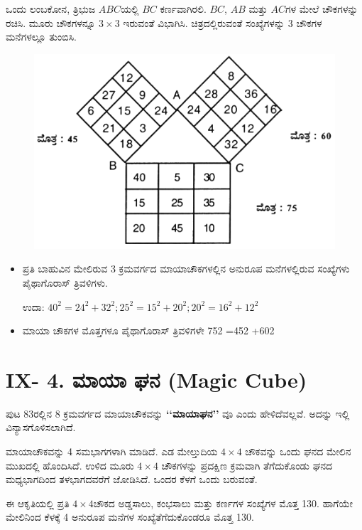 \medskip
ಒಂದು ಲಂಬಕೋನ, ತ್ರಿಭುಜ $ABC$ಯಲ್ಲಿ $BC$ ಕರ್ಣವಾಗಿರಲಿ. $BC$, $AB$ ಮತ್ತು $AC$ಗಳ ಮೇಲೆ ಚೌಕಗಳನ್ನು ರಚಿಸಿ. ಮೂರು ಚೌಕಗಳನ್ನೂ $3 \times 3$ ಇರುವಂತೆ \break ವಿಭಾಗಿಸಿ. ಚಿತ್ರದಲ್ಲಿರುವಂತೆ ಸಂಖ್ಯೆಗಳನ್ನು 3 ಚೌಕಗಳ ಮನೆಗಳಲ್ಲೂ ತುಂಬಿಸಿ.
\begin{figure}[H]
\includegraphics[scale=1.2]{src/figures/chap8/fig8-10.jpg}
\end{figure}
\begin{itemize}
	\item ಪ್ರತಿ ಬಾಹುವಿನ ಮೇಲಿರುವ 3 ಕ್ರಮವರ್ಗದ ಮಾಯಾಚೌಕಗಳಲ್ಲಿನ ಅನುರೂಪ ಮನೆಗಳಲ್ಲಿರುವ ಸಂಖ್ಯೆಗಳು ಪೈಥಾಗೊರಾಸ್ ತ್ರಿವಳಿಗಳು.

	ಉದಾ: $40^2 = 24^2 +32^2 ; 25^2 =15^2 +20^2 ; 20^2 =16^2+12^2$\smallskip
	\item ಮಾಯಾ ಚೌಕಗಳ ಮೊತ್ತಗಳೂ ಪೈಥಾಗೊರಾಸ್ ತ್ರಿವಳಿಗಳೇ 752 =452 +602
\end{itemize}
\eject

\section*{IX- 4. ಮಾಯಾ ಘನ (Magic Cube)}

ಪುಟ 83ರಲ್ಲಿನ 8 ಕ್ರಮವರ್ಗದ ಮಾಯಾಚೌಕವನ್ನು \textbf{‘‘ಮಾಯಾಘನ’’} ವೂ ಎಂದು ಹೇಳಿದೆವಲ್ಲವೆ. ಅದನ್ನು ಇಲ್ಲಿ ವಿನ್ಯಾಸಗೊಳಿಸಲಾಗಿದೆ.

ಮಾಯಾಚೌಕವನ್ನು 4 ಸಮಭಾಗಗಳಾಗಿ ಮಾಡಿದೆ. ಎಡ ಮೇಲ್ತುದಿಯ $4 \times 4$ ಚೌಕ\-ವನ್ನು ಒಂದು ಘನದ ಮೇಲಿನ ಮುಖದಲ್ಲಿ ಹೊಂದಿಸಿದೆ. ಉಳಿದ ಮೂರು $4 \times 4$ ಚೌಕ\-ಗಳನ್ನು ಪ್ರದಕ್ಷಿಣ ಕ್ರಮವಾಗಿ ತೆಗೆದುಕೊಂಡು ಘನದ ಮಧ್ಯಭಾಗದಿಂದ ತಳಭಾಗದವರೆಗೆ ಜೋಡಿಸಿದೆ. ಒಂದರ ಕೆಳಗೆ ಒಂದು ಬರುವಂತೆ.

ಈ ಆಕೃತಿಯಲ್ಲಿ ಪ್ರತಿ $4 \times 4$ಚೌಕದ ಅಡ್ಡಸಾಲು, ಕಂಭಸಾಲು ಮತ್ತು ಕರ್ಣಗಳ ಸಂಖ್ಯೆಗಳ ಮೊತ್ತ 130. ಹಾಗೆಯೇ ಮೇಲಿನಿಂದ ಕೆಳಕ್ಕೆ 4 ಅನುರೂಪ ಮನೆಗಳ ಸಂಖ್ಯೆತೆಗೆದು\-ಕೊಂಡರೂ ಮೊತ್ತ 130.

